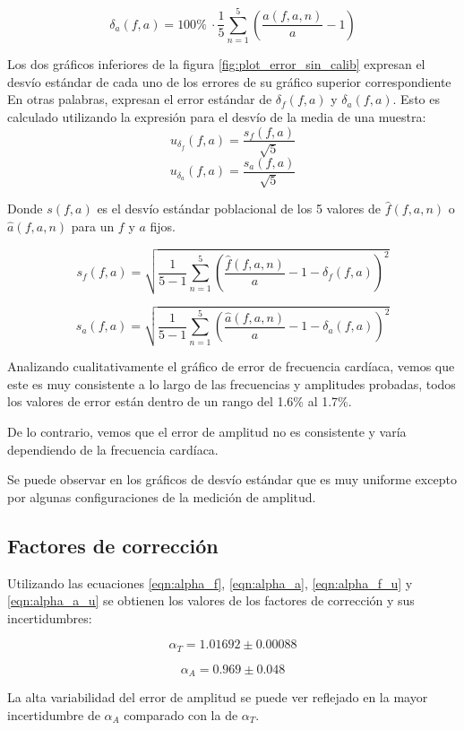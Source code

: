 \documentclass[conference]{IEEEtran}
\begin{document}
$$ \delta_{a} \left(f, a\right) = 100 \% ~ \cdot \dfrac{1}{5} \sum_{n=1}^{5}
\left( \dfrac{\hat{a}(f,a,n)}{a} - 1\right)$$


Los dos gráficos inferiores de la figura \ref{fig:plot_error_sin_calib}
expresan el desvío estándar de cada uno de los errores de su gráfico superior
correspondiente En otras palabras, expresan el error estándar de $\delta_{f}
\left(f, a\right) $ y $\delta_{a} \left(f, a\right)$. Esto es calculado
utilizando la expresión para el desvío de la media de una muestra:
{\large
\[
 u_{\delta_f}(f,a) = \frac{s_f(f,a)}{\sqrt{5}}
\]
\[
 u_{\delta_a}(f,a) = \frac{s_a(f,a)}{\sqrt{5}}
\]
}
 
Donde $s(f, a)$ es el desvío estándar poblacional de los 5 valores de
$\hat{f}(f,a, n)$ o $\hat{a}(f, a, n)$ para un $f$ y $a$ fijos.


$$s_f(f,a) = \sqrt{ \frac{1}{5 - 1} \sum_{n=1}^{5}
\left( \dfrac{\hat{f}(f,a,n)}{a} - 1 - \delta_{f} \left(f, a\right)
\right)^2} $$
 

$$s_a(f,a) = \sqrt{ \frac{1}{5 - 1} \sum_{n=1}^{5}
\left( \dfrac{\hat{a}(f,a,n)}{a} - 1 - \delta_{a} \left(f, a\right)
\right)^2} $$
 

Analizando cualitativamente el gráfico de error de frecuencia cardíaca, vemos
que este es muy consistente a lo largo de las frecuencias y amplitudes probadas,
todos los valores de error están dentro de un rango del 1.6\% al 1.7\%.

De lo contrario, vemos que el error de amplitud no es consistente y varía
dependiendo de la frecuencia cardíaca.

Se puede observar en los gráficos de desvío estándar que es muy uniforme
excepto por algunas configuraciones de la medición de amplitud.

\subsection{Factores de corrección}

Utilizando las ecuaciones \ref{eqn:alpha_f}, \ref{eqn:alpha_a},
\ref{eqn:alpha_f_u} y \ref{eqn:alpha_a_u} se obtienen los valores de los
factores de corrección y sus incertidumbres:

\boldmath
$$ \alpha_{T} = 1.01692 \pm 0.00088 $$

$$ \alpha_{A} = 0.969 \pm 0.048 $$
\unboldmath  

La alta variabilidad del error de amplitud se puede ver reflejado en la
mayor incertidumbre de $\alpha_{A}$ comparado con la de $\alpha_{T}$.
\end{document}
